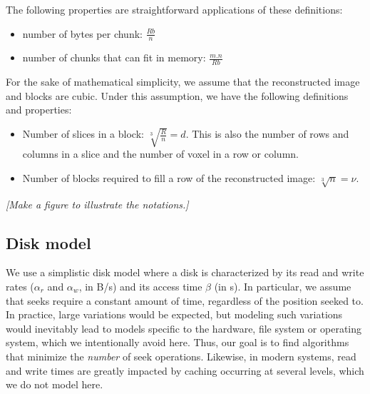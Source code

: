 \documentclass[10pt, conference, compsocconf]{IEEEtran}
\newcommand{\todo}[1]{
  \color{red}\emph{[#1]}
  \color{black}
}
\begin{document}
The following properties are straightforward applications of these
definitions:
\begin{itemize}
\item number of bytes per chunk: $\frac{Rb}{n}$
\item number of chunks that can fit in memory: $\frac{m.n}{Rb}$
\end{itemize}
For the sake of mathematical simplicity, we assume that
the reconstructed image and blocks are cubic. Under this assumption,
we have the following definitions and properties:
\begin{itemize}
\item Number of slices in a block: $\sqrt[3]{\frac{R}{n}}=d$. This is
  also the number of rows and columns in a slice and the number of
  voxel in a row or column.
\item Number of blocks required to fill a row of the reconstructed
  image: $\sqrt[3]{n}=\nu$.
\end{itemize}
\todo{Make a figure to illustrate the notations.}

\subsection{Disk model}

We use a simplistic disk model where a disk is characterized by its
read and write rates ($\alpha_r$ and $\alpha_w$, in B/s) and its
access time $\beta$ (in s). In particular, we assume that seeks
require a constant amount of time, regardless of the position seeked
to. In practice, large variations would be expected, but modeling such
variations would inevitably lead to models specific to the hardware,
file system or operating system, which we intentionally avoid
here. Thus, our goal is to find algorithms that minimize the
\emph{number} of seek operations. Likewise, in modern systems, read
and write times are greatly impacted by caching occurring at several
levels, which we do not model here.

\end{document}
